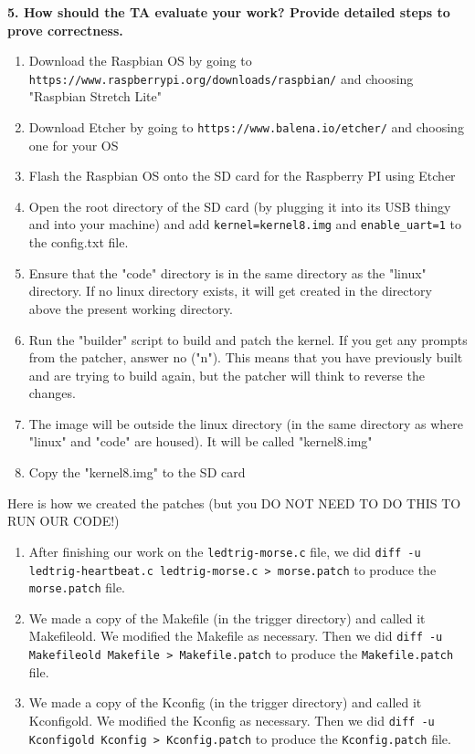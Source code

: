 \documentclass[10pt,english]{article}
\begin{document}
\noindent \textbf{5. How should the TA evaluate your work? Provide detailed steps to prove correctness.}
\begin{enumerate}
\item Download the Raspbian OS by going to \verb|https://www.raspberrypi.org/downloads/raspbian/| and choosing "Raspbian Stretch Lite"
\item Download Etcher by going to \verb|https://www.balena.io/etcher/| and choosing one for your OS
\item Flash the Raspbian OS onto the SD card for the Raspberry PI using Etcher
\item Open the root directory of the SD card (by plugging it into its USB thingy and into your machine) and add \verb|kernel=kernel8.img| and \verb|enable_uart=1| to the config.txt file.
\item Ensure that the "code" directory is in the same directory as the "linux" directory. If no linux directory exists, it will get created in the directory above the present working directory.
\item Run the "builder" script to build and patch the kernel. If you get any prompts from the patcher, answer no ("n"). This means that you have previously built and are trying to build again, but the patcher will think to reverse the changes. 
\item The image will be outside the linux directory (in the same directory as where "linux" and "code" are housed). It will be called "kernel8.img"
\item Copy the "kernel8.img" to the SD card  \\
\end{enumerate}

Here is how we created the patches (but you DO NOT NEED TO DO THIS TO RUN OUR CODE!)
\begin{enumerate}
\item After finishing our work on the \verb|ledtrig-morse.c| file, we did \verb|diff -u ledtrig-heartbeat.c ledtrig-morse.c > morse.patch| to produce the \verb|morse.patch| file. 
\item We made a copy of the Makefile (in the trigger directory) and called it Makefileold. We modified the Makefile as necessary. Then we did \verb|diff -u Makefileold Makefile > Makefile.patch| to produce the \verb|Makefile.patch| file.
\item We made a copy of the Kconfig (in the trigger directory) and called it Kconfigold. We modified the Kconfig as necessary. Then we did \verb|diff -u Kconfigold Kconfig > Kconfig.patch| to produce the \verb|Kconfig.patch| file.
\end{enumerate}
\end{document}
